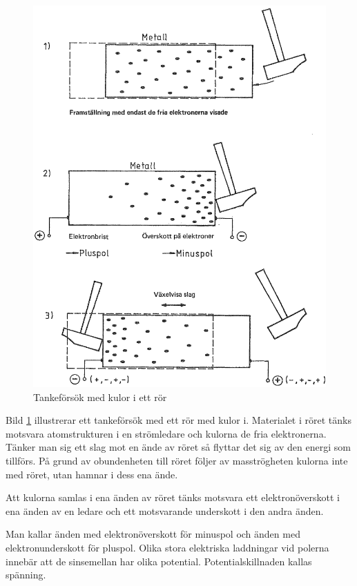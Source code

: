 \begin{figure}
\begin{center}
\includegraphics[width=\textwidth]{images/cropped_pdfs/bild_2_1-02.pdf}
\caption{Tankeförsök med kulor i ett rör}
\label{fig:BildII1-2}
\end{center}
\end{figure}

Bild \ref{fig:BildII1-2} illustrerar ett tankeförsök med ett rör med kulor i.
Materialet i röret tänks motsvara atomstrukturen i en strömledare och kulorna
de fria elektronerna.
Tänker man sig ett slag mot en ände av röret så flyttar det sig av den energi
som tillförs.
På grund av obundenheten till röret följer av masströgheten kulorna inte med
röret, utan hamnar i dess ena ände.

Att kulorna samlas i ena änden av röret tänks motsvara ett elektronöverskott i
ena änden av en ledare och ett motsvarande underskott i den andra änden.

Man kallar änden med elektronöverskott för minuspol och änden med
elektronunderskott för pluspol.
Olika stora elektriska laddningar vid polerna innebär att de sinsemellan har
olika potential.
Potentialskillnaden kallas spänning.

